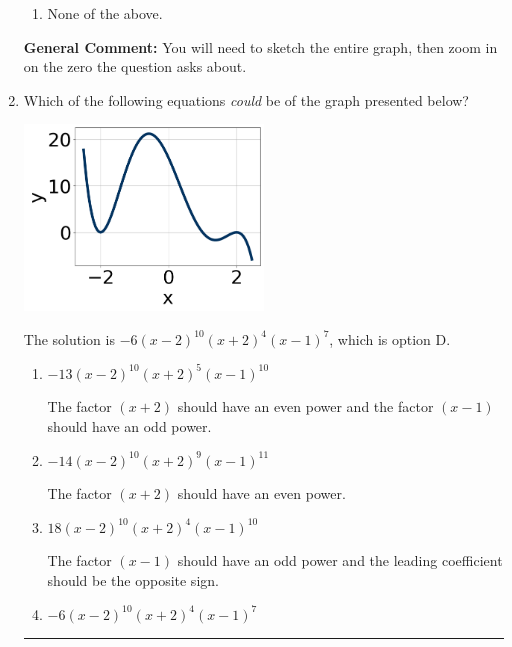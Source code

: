 \documentclass{extbook}[14pt]
\newcommand{\litem}[1]{\item #1

\rule{\textwidth}{0.4pt}}
\begin{document}
\begin{enumerate}
{\begin{enumerate}[label=\Alph*.]
\item None of the above.\end{enumerate}
\textbf{General Comment:} You will need to sketch the entire graph, then zoom in on the zero the question asks about.
}
\litem{
Which of the following equations \textit{could} be of the graph presented below?

\begin{center}
    \includegraphics[width=0.5\textwidth]{../Figures/polyGraphToFunctionC.png}
\end{center}


The solution is \( -6(x - 2)^{10} (x + 2)^{4} (x - 1)^{7} \), which is option D.\begin{enumerate}[label=\Alph*.]
\item \( -13(x - 2)^{10} (x + 2)^{5} (x - 1)^{10} \)

The factor $(x + 2)$ should have an even power and the factor $(x - 1)$ should have an odd power.
\item \( -14(x - 2)^{10} (x + 2)^{9} (x - 1)^{11} \)

The factor $(x + 2)$ should have an even power.
\item \( 18(x - 2)^{10} (x + 2)^{4} (x - 1)^{10} \)

The factor $(x - 1)$ should have an odd power and the leading coefficient should be the opposite sign.
\item \( -6(x - 2)^{10} (x + 2)^{4} (x - 1)^{7} \)


\end{enumerate}}
\end{enumerate}
\end{document}

